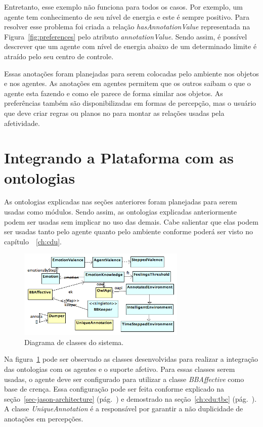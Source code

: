 Entretanto, esse exemplo não funciona para todos os casos. Por exemplo, um
agente tem conhecimento de seu nível de energia e este é sempre positivo. Para
resolver esse problema foi criada a relação \emph{hasAnnotationValue}
representada na Figura~\ref{fig:preferences} pelo atributo
\emph{annotationValue}. Sendo assim, é possível descrever que um agente com
nível de energia abaixo de um determinado limite é atraído pelo seu centro de
controle.

Essas anotações foram planejadas para serem colocadas pelo ambiente
nos objetos e nos agentes. As anotações em agentes permitem que os outros saibam
o que o agente esta fazendo e como ele parece de forma similar aos objetos. As
preferências também são disponibilizadas em formas de percepção, mas o usuário
que deve criar regras ou planos no \jason para montar as relações usadas pela
afetividade.

\section{Integrando a Plataforma \jason com as ontologias} \label{ch:p:ipjo}

As ontologias explicadas nas seções anteriores foram planejadas para serem
usadas como módulos. Sendo assim, as ontologias explicadas anteriormente
podem ser usadas sem implicar no uso das demais. Cabe salientar que elas podem ser
usadas tanto pelo agente quanto pelo ambiente conforme poderá ser visto no
capítulo~~\ref{ch:cdu}.

\begin{figure}[b]
  \centering
  \includegraphics[width=8cm]{figuras/implementacao-15dez2011.png}
  \caption{Diagrama de classes do sistema.}
  \label{fig:dcs}
\end{figure}

Na figura~\ref{fig:dcs} pode ser observado as classes desenvolvidas para
realizar a integração das ontologias com os agentes \jason e o suporte
afetivo. Para essas classes serem usadas, o agente deve ser configurado para
utilizar a classe \emph{BBAffective} como base de crença. Essa configuração
pode ser feita conforme explicado na seção~\ref{sec-jason-architecture}
(pág.~\pageref{sec-jason-architecture}) e demostrado na seção~\ref{ch:cdu:tbc}
(pág.~\pageref{ch:cdu:tbc}). A classe \emph{UniqueAnnotation} é a responsável
por garantir a não duplicidade de anotações em percepções. %

